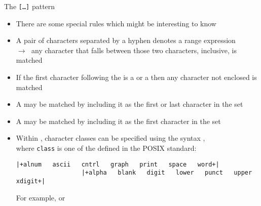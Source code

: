 \begin{frame}[fragile]{The \texttt{[\ldots]} pattern}
    \vspace{-3mm}
    \begin{itemize}
        \item There are some special rules which might be interesting to know
        \item A pair of characters separated by a hyphen denotes a range expression\\
              $\to\;$ any character that falls between those two characters, inclusive, is matched
        \item If the first character following the \PB{\texttt{[}} is a \PP{\texttt{!}} or a \PP{\texttt{\^{}}} then any character not enclosed is matched
        \item A \PP{\texttt{-}} may be matched by including it as the first or last character in the set
        \item A \PP{\texttt{]}} may be matched by including it as the first character in the set
        \item Within \PB{\texttt{[\ldots]}}, character classes can be specified using the syntax \PB{\texttt{[:class:]}},\\
              where \texttt{class} is one of the  defined in the POSIX standard:
              \begin{lstlisting}[style=MyBash, numbers=none, xleftmargin=2mm, xrightmargin=15mm, aboveskip=3mm, belowskip=-5mm]
                  |+alnum   ascii   cntrl   graph   print   space   word+|
                  |+alpha   blank   digit   lower   punct   upper   xdigit+|
              \end{lstlisting}
              For example, \PB{\texttt{[[:digit:]]}} or \PB{\texttt{[[:blank:]]}}
    \end{itemize}
\end{frame}
